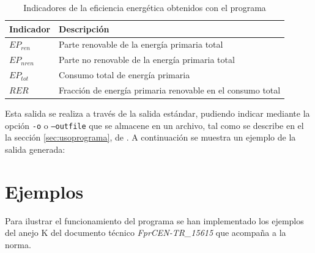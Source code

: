 \documentclass[10pt,notitlepage,oneside,a4paper]{article}
\begin{document}
\begin{table}[H]
\centering
\small
\caption{Indicadores de la eficiencia energética obtenidos con el programa}\label{tab:indicadoresFinales}
\begin{tabular}{ll}
    \toprule
    \textbf{Indicador} & \textbf{Descripción}\\
    \midrule
    $EP_{ren}$ & Parte renovable de la energía primaria total\\
    $EP_{nren}$& Parte no renovable de la energía primaria total\\
    $EP_{tot}$ & Consumo total de energía primaria\\
    $RER$      & Fracción de energía primaria renovable en el consumo total\\
    \bottomrule
\end{tabular}
\end{table}

Esta salida se realiza a través de la salida estándar, pudiendo indicar mediante la opción \texttt{-o} o \texttt{--outfile} que se almacene en un archivo, tal como se describe en el la sección \autoref{sec:usoprograma}, de . A continuación se muestra un ejemplo de la salida generada:


\clearpage
\newpage


\setcounter{section}{0} %
\renewcommand\thesection{Anexo~\Roman{section}}
\renewcommand\theHsection{Anexo~\Roman{section}}
\renewcommand\thesubsection{\Roman{section}.\arabic{subsection}}
\renewcommand\theHsubsection{\Roman{section}.\arabic{subsection}}
\renewcommand{\thefigure}{\Roman{section}.\arabic{figure}}
\renewcommand{\theHfigure}{\Roman{section}.\arabic{figure}}
\renewcommand{\thetable}{\Roman{section}.\arabic{table}}
\renewcommand{\theHtable}{\Roman{section}.\arabic{table}}

\section{Ejemplos}
\label{sec:anexoejemplos}
\setcounter{figure}{0} %
\setcounter{table}{0} %

Para ilustrar el funcionamiento del programa se han implementado los ejemplos del anejo K del documento técnico \textit{FprCEN-TR\_15615} que acompaña a la norma.
\end{document}
